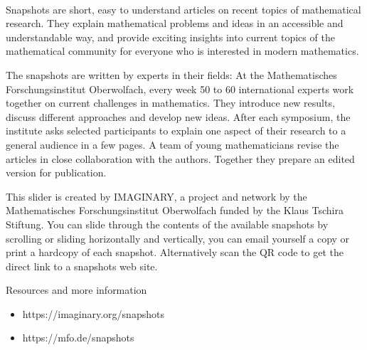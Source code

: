 \documentclass[10pt]{article}
\begin{document}
%
\pagecolor{black}%
\color{white}%
%
{\centering%
    \sffamily%
    \\[0.2cm]
}
\vfill

\noindent Snapshots are short, easy to understand articles on recent topics of mathematical research. They explain mathematical problems and ideas in an accessible and understandable way, and provide exciting insights into current topics of the mathematical community for everyone who is interested in modern mathematics.

The snapshots are written by experts in their fields: At the Mathematisches Forschungsinstitut Oberwolfach, every week 50 to 60 international experts work together on current challenges in mathematics. They introduce new results, discuss different approaches and develop new ideas. After each symposium, the institute asks selected participants to explain one aspect of their research to a general audience in a few pages. A team of young mathematicians revise the articles in close collaboration with the authors. Together they prepare an edited version for publication.

This slider is created by IMAGINARY, a project and network by the Mathematisches Forschungsinstitut Oberwolfach funded by the Klaus Tschira Stiftung. \newline
\noindent{}
%
%
\noindent You can slide through the contents of the available snapshots by scrolling or sliding horizontally and vertically, you can email yourself a copy or print a hardcopy of each snapshot. Alternatively scan the QR code to get the direct link to a snapshots web site.
\vspace{4\bigskipamount}

\noindent Resources and more information
\begin{itemize}
    \item https://imaginary.org/snapshots
    \item https://mfo.de/snapshots
\end{itemize}
\bigskip
\bigskip
\end{document}
